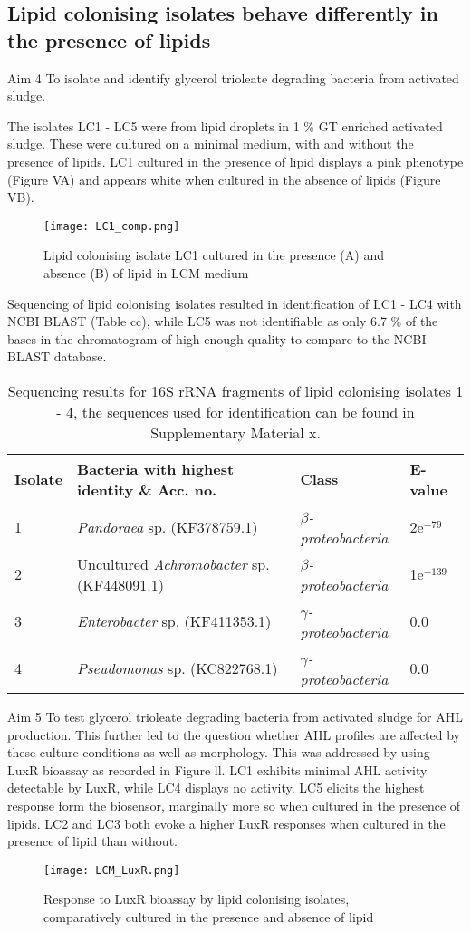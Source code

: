\documentclass[11pt]{article}
\begin{document}
\subsection{Lipid colonising isolates behave differently in the presence of lipids}
Aim 4 To isolate and identify glycerol trioleate degrading bacteria from activated sludge.

The isolates LC1 - LC5 were from lipid droplets in 1 \% GT enriched activated sludge. These were cultured on a minimal medium, with and without the presence of lipids. LC1 cultured in the presence of lipid displays a pink phenotype (Figure VA) and appears white when cultured in the absence of lipids (Figure VB).

\begin{figure}
\texttt{[image: LC1\_comp.png]}
\caption{Lipid colonising isolate LC1 cultured in the presence (A) and absence (B) of lipid in LCM medium}
\end{figure}



Sequencing of lipid colonising isolates resulted in identification of LC1 - LC4 with NCBI BLAST (Table cc), while LC5 was not identifiable as only 6.7 \% of the bases in the chromatogram of high enough quality to compare to the NCBI BLAST database.
	
\begin{table}
\caption{Sequencing results for 16S rRNA fragments of lipid colonising isolates 1 - 4, the sequences used for identification can be found in Supplementary Material  x.}
\begin{tabular}{ | l | p{7.8cm} | p{3cm} | l | }
\hline
Isolate & Bacteria with highest identity \& Acc. no. & Class & E-value \\
\hline
1 &  \emph{Pandoraea} sp. (KF378759.1) & \emph{$\beta$-proteobacteria} & 2e$^{-79}$ \\
\hline
2 & Uncultured \emph{Achromobacter} sp. (KF448091.1) & \emph{$\beta$-proteobacteria} & 1e$^{-139}$ \\
\hline
3 & \emph{Enterobacter} sp. (KF411353.1) & \emph{$\gamma$-proteobacteria} & 0.0 \\
\hline
4 & \emph{Pseudomonas} sp. (KC822768.1) & \emph{$\gamma$-proteobacteria} & 0.0 \\
\hline
\end{tabular}
\end{table}
\FloatBarrier

Aim 5 To test glycerol trioleate degrading bacteria from activated sludge for AHL production.
This further led to the question whether AHL profiles are affected by these culture conditions as well as morphology. This was addressed by using LuxR bioassay as recorded in Figure ll. LC1 exhibits minimal AHL activity detectable by LuxR, while LC4 displays no activity. LC5 elicits the highest response form the biosensor, marginally more so when cultured in the presence of lipids. LC2 and LC3 both evoke a higher LuxR responses when cultured in the presence of lipid than without.


\begin{figure}
\texttt{[image: LCM\_LuxR.png]}
\caption{Response to LuxR bioassay by lipid colonising isolates, comparatively cultured in the presence and absence of lipid }
\end{figure}
\FloatBarrier
\end{document}
